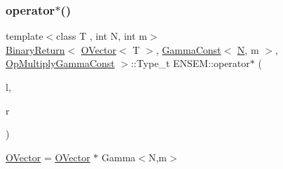 \subsubsection{\texorpdfstring{operator$\ast$()}{operator*()}\hspace{0.1cm}{\footnotesize\ttfamily [6/8]}}
{\footnotesize\ttfamily template$<$class T , int N, int m$>$ \\
\mbox{\hyperlink{structENSEM_1_1BinaryReturn}{Binary\+Return}}$<$ \mbox{\hyperlink{classENSEM_1_1OVector}{O\+Vector}}$<$ T $>$, \mbox{\hyperlink{classENSEM_1_1GammaConst}{Gamma\+Const}}$<$ \mbox{\hyperlink{adat__devel_2lib_2hadron_2operator__name__util_8cc_a7722c8ecbb62d99aee7ce68b1752f337}{N}}, m $>$, \mbox{\hyperlink{structENSEM_1_1OpMultiplyGammaConst}{Op\+Multiply\+Gamma\+Const}} $>$\+::Type\+\_\+t E\+N\+S\+E\+M\+::operator$\ast$ (\begin{DoxyParamCaption}\item[{const \mbox{\hyperlink{classENSEM_1_1OVector}{O\+Vector}}$<$ T $>$ \&}]{l,  }\item[{const \mbox{\hyperlink{classENSEM_1_1GammaConst}{Gamma\+Const}}$<$ \mbox{\hyperlink{adat__devel_2lib_2hadron_2operator__name__util_8cc_a7722c8ecbb62d99aee7ce68b1752f337}{N}}, m $>$ \&}]{r }\end{DoxyParamCaption})\hspace{0.3cm}{\ttfamily [inline]}}



\mbox{\hyperlink{classENSEM_1_1OVector}{O\+Vector}} = \mbox{\hyperlink{classENSEM_1_1OVector}{O\+Vector}} $\ast$ Gamma$<$\+N,m$>$ 

\mbox{\label{group__obsvector_gaa96dcdea35ea89a0405ab2273dfaa9a9}} 

